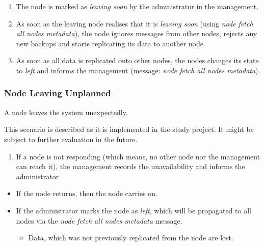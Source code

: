 \begin{enumerate}
    \item The node is marked as \emph{leaving soon} by the administrator in the management.
    \item As soon as the leaving node realises that it is \emph{leaving soon} (using \emph{node fetch all nodes metadata}), the node ignores messages from other nodes, rejects any new backups and starts replicating its data to another node.
    \item As soon as all data is replicated onto other nodes, the nodes changes its state to \emph{left} and informs the management (message: \emph{node fetch all nodes metadata}). %
\end{enumerate}

\subsubsection{Node Leaving Unplanned}\label{sec:scenario-node-leave-unplanned}
A node leaves the system unexpectedly.

This scenario is described as it is implemented in the study project. It might be subject to further evaluation in the future.

\begin{enumerate}
    \item If a node is not responding (which means, no other node nor the management can reach it), the management records the unavailability and informs the administrator.
\end{enumerate}

\begin{itemize}
    \item If the node returns, then the node carries on.
    \item If the administrator marks the node as \emph{left}, which will be propagated to all nodes via the \emph{node fetch all nodes metadata} message.
        \begin{itemize}
            \item Data, which was not previously replicated from the node are lost.
        \end{itemize}
\end{itemize}

